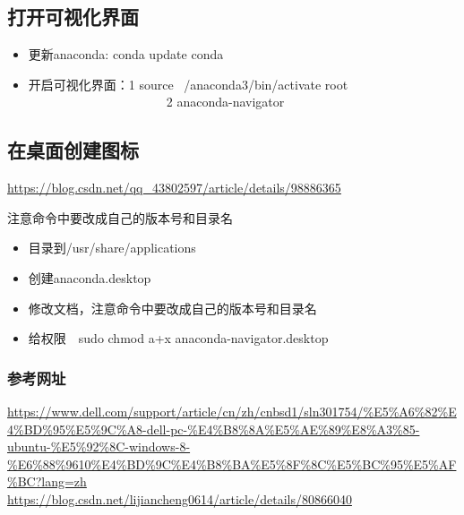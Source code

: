 \documentclass[12pt,a4paper]{article}
\begin{document}
\subsection{打开可视化界面}
\begin{itemize}
\item 更新anaconda: conda update conda
\item 开启可视化界面：1 source ~/anaconda3/bin/activate root\\
　　　　　　　　　　　2 anaconda-navigator
\end{itemize}

\subsection{在桌面创建图标}
\url{https://blog.csdn.net/qq_43802597/article/details/98886365}　

注意命令中要改成自己的版本号和目录名
\begin{itemize}
\item 目录到/usr/share/applications
\item 创建anaconda.desktop
\item 修改文档，注意命令中要改成自己的版本号和目录名\\

\item 给权限　sudo chmod a+x anaconda-navigator.desktop
\end{itemize}
\subsubsection{参考网址}
	\url{https://www.dell.com/support/article/cn/zh/cnbsd1/sln301754/%E5%A6%82%E4%BD%95%E5%9C%A8-dell-pc-%E4%B8%8A%E5%AE%89%E8%A3%85-ubuntu-%E5%92%8C-windows-8-%E6%88%9610%E4%BD%9C%E4%B8%BA%E5%8F%8C%E5%BC%95%E5%AF%BC?lang=zh}
	\\
	\url{https://blog.csdn.net/lijiancheng0614/article/details/80866040}
	
	
\end{document}
